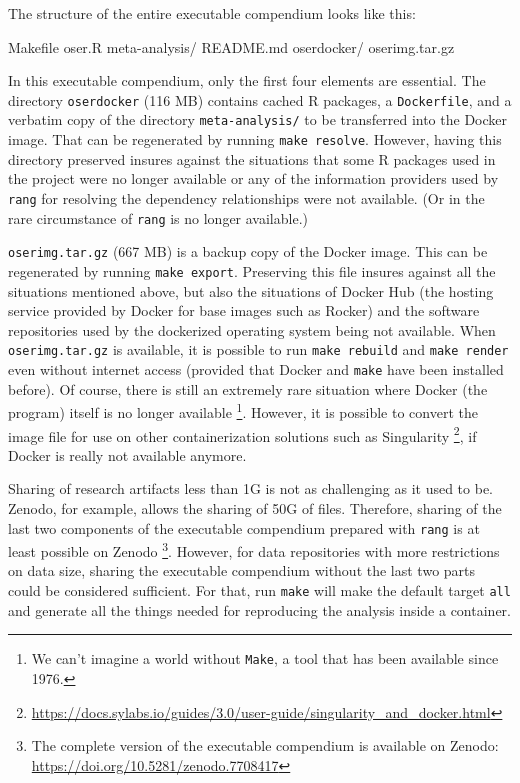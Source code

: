 \documentclass[
  10pt,
  letterpaper,
]{article}
\newenvironment{Shaded}{\begin{snugshade}}{\end{snugshade}}
\newcommand{\ExtensionTok}[1]{\textcolor[rgb]{0.00,0.23,0.31}{#1}}
\begin{document}
The structure of the entire executable compendium looks like this:

\begin{Shaded}
\begin{Highlighting}[]
\ExtensionTok{Makefile}
\ExtensionTok{oser.R}
\ExtensionTok{meta{-}analysis/}
\ExtensionTok{README.md}
\ExtensionTok{oserdocker/}
\ExtensionTok{oserimg.tar.gz}
\end{Highlighting}
\end{Shaded}

In this executable compendium, only the first four elements are
essential. The directory \texttt{oserdocker} (116 MB) contains cached R
packages, a \texttt{Dockerfile}, and a verbatim copy of the directory
\texttt{meta-analysis/} to be transferred into the Docker image. That
can be regenerated by running \texttt{make\ resolve}. However, having
this directory preserved insures against the situations that some R
packages used in the project were no longer available or any of the
information providers used by \texttt{rang} for resolving the dependency
relationships were not available. (Or in the rare circumstance of
\texttt{rang} is no longer available.)

\texttt{oserimg.tar.gz} (667 MB) is a backup copy of the Docker image.
This can be regenerated by running \texttt{make\ export}. Preserving
this file insures against all the situations mentioned above, but also
the situations of Docker Hub (the hosting service provided by Docker for
base images such as Rocker) and the software repositories used by the
dockerized operating system being not available. When
\texttt{oserimg.tar.gz} is available, it is possible to run
\texttt{make\ rebuild} and \texttt{make\ render} even without internet
access (provided that Docker and \texttt{make} have been installed
before). Of course, there is still an extremely rare situation where
Docker (the program) itself is no longer available \footnote{We can't
  imagine a world without \texttt{Make}, a tool that has been available
  since 1976.}. However, it is possible to convert the image file for
use on other containerization solutions such as Singularity \footnote{\url{https://docs.sylabs.io/guides/3.0/user-guide/singularity_and_docker.html}},
if Docker is really not available anymore.

Sharing of research artifacts less than 1G is not as challenging as it
used to be. Zenodo, for example, allows the sharing of 50G of files.
Therefore, sharing of the last two components of the executable
compendium prepared with \texttt{rang} is at least possible on Zenodo
\footnote{The complete version of the executable compendium is available
  on Zenodo: \url{https://doi.org/10.5281/zenodo.7708417}}. However, for
data repositories with more restrictions on data size, sharing the
executable compendium without the last two parts could be considered
sufficient. For that, run \texttt{make} will make the default target
\texttt{all} and generate all the things needed for reproducing the
analysis inside a container.
\end{document}
